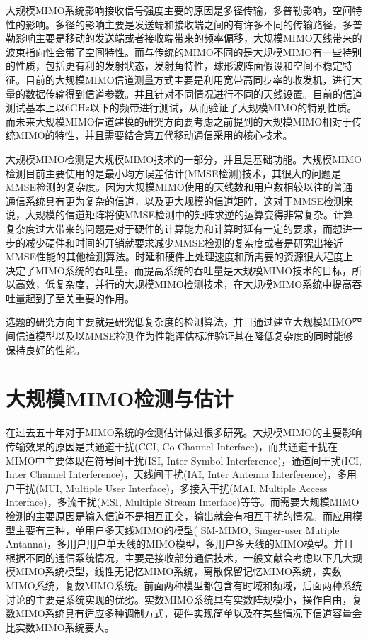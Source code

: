 \documentclass[bachelor,nocolorlinks, printoneside]{seuthesis} %
\begin{document}
\begin{Main}
大规模MIMO系统影响接收信号强度主要的原因是多径传输，多普勒影响，空间特性的影响。多径的影响主要是发送端和接收端之间的有许多不同的传输路径，多普勒影响主要是移动的发送端或者接收端带来的频率偏移，大规模MIMO天线带来的波束指向性会带了空间特性。而与传统的MIMO不同的是大规模MIMO有一些特别的性质，包括更有利的发射状态，发射角特性，球形波阵面假设和空间不稳定特征。目前的大规模MIMO信道测量方式主要是利用宽带高同步率的收发机，进行大量的数据传输得到信道参数。并且针对不同情况进行不同的天线设置。目前的信道测试基本上以6GHz以下的频带进行测试，从而验证了大规模MIMO的特别性质。而未来大规模MIMO信道建模的研究方向要考虑之前提到的大规模MIMO相对于传统MIMO的特性，并且需要结合第五代移动通信采用的核心技术。

大规模MIMO检测是大规模MIMO技术的一部分，并且是基础功能。大规模MIMO检测目前主要使用的是最小均方误差估计(MMSE检测)技术，其很大的问题是MMSE检测的复杂度。因为大规模MIMO使用的天线数和用户数相较以往的普通通信系统具有更为复杂的信道，以及更大规模的信道矩阵，这对于MMSE检测来说，大规模的信道矩阵将使MMSE检测中的矩阵求逆的运算变得非常复杂。计算复杂度过大带来的问题是对于硬件的计算能力和计算时延有一定的要求，而想进一步的减少硬件和时间的开销就要求减少MMSE检测的复杂度或者是研究出接近MMSE性能的其他检测算法。时延和硬件上处理速度和所需要的资源很大程度上决定了MIMO系统的吞吐量。而提高系统的吞吐量是大规模MIMO技术的目标，所以高效，低复杂度，并行的大规模MIMO检测技术，在大规模MIMO系统中提高吞吐量起到了至关重要的作用。\cite{yang2015fifty}

选题的研究方向主要就是研究低复杂度的检测算法，并且通过建立大规模MIMO空间信道模型以及以MMSE检测作为性能评估标准验证其在降低复杂度的同时能够保持良好的性能。

\section{大规模MIMO检测与估计}
在过去五十年对于MIMO系统的检测估计做过很多研究。大规模MIMO的主要影响传输效果的原因是共通道干扰(CCI, Co-Channel Interface)，而共通道干扰在MIMO中主要体现在符号间干扰(ISI, Inter Symbol Interference)，通道间干扰(ICI, Inter Channel Interference)，天线间干扰(IAI, Inter Antenna Interference)，多用户干扰(MUI, Multiple User Interface)，多接入干扰(MAI, Multiple Access Interface)，多流干扰(MSI, Multiple Stream Interface)等等。而需要大规模MIMO检测的主要原因是输入信道不是相互正交，输出就会有相互干扰的情况。而应用模型主要有三种，单用户多天线MIMO的模型( SM-MIMO, Singer-user Mutiple Antanna)，多用户用户单天线的MIMO模型，多用户多天线的MIMO模型。并且根据不同的通信系统情况，主要是接收部分通信技术，一般文献会考虑以下几大规模MIMO系统模型，线性无记忆MIMO系统，离散保留记忆MIMO系统，实数MIMO系统，复数MIMO系统。前面两种模型都包含有时域和频域，后面两种系统讨论的主要是系统实现的优劣。实数MIMO系统具有实数阵规模小，操作自由，复数MIMO系统具有适应多种调制方式，硬件实现简单以及在某些情况下信道容量会比实数MIMO系统要大\cite{chen2017low}。


\end{Main}
\end{document}
